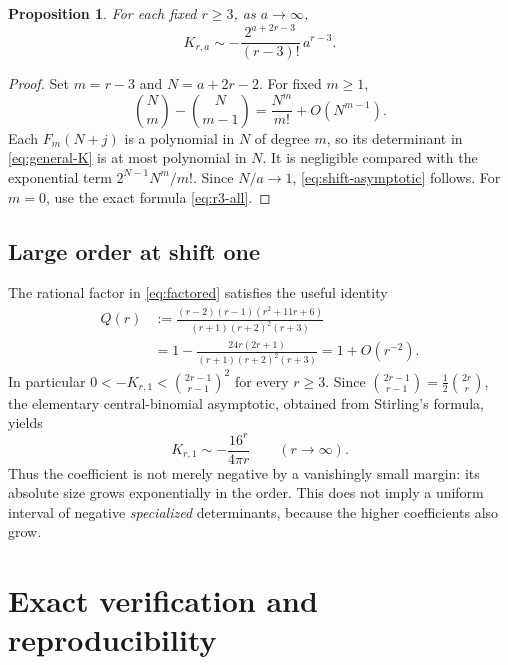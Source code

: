 \documentclass[11pt,a4paper]{article}
\newtheorem{proposition}[theorem]{Proposition}
\theoremstyle{definition}
\numberwithin{equation}{section}
\begin{document}
\begin{proposition}
\label{prop:shift-asymptotic}
For each fixed $r\ge3$, as $a\to\infty$,
\begin{equation}
 K_{r,a}\sim
 -\frac{2^{a+2r-3}}{(r-3)!}\,a^{r-3}.
 \label{eq:shift-asymptotic}
\end{equation}
\end{proposition}
\begin{proof}
Set $m=r-3$ and $N=a+2r-2$. For fixed $m\ge1$,
\[
 \binom Nm-\binom N{m-1}
   =\frac{N^m}{m!}+O(N^{m-1}).
\]
Each $F_m(N+j)$ is a polynomial in $N$ of degree $m$, so its determinant
in \eqref{eq:general-K} is at most polynomial in $N$. It is negligible
compared with the exponential term $2^{N-1}N^m/m!$. Since $N/a\to1$,
\eqref{eq:shift-asymptotic} follows. For $m=0$, use the exact formula
\eqref{eq:r3-all}.
\end{proof}

\subsection{Large order at shift one}

The rational factor in \eqref{eq:factored} satisfies the useful identity
\begin{equation}
 \begin{split}
 Q(r)&:=\frac{(r-2)(r-1)(r^2+11r+6)}{(r+1)(r+2)^2(r+3)}\\
     &=1-\frac{24r(2r+1)}{(r+1)(r+2)^2(r+3)}
       =1+O(r^{-2}).
 \end{split}
 \label{eq:Qasym}
\end{equation}
In particular $0<-K_{r,1}<\binom{2r-1}{r-1}^2$ for every $r\ge3$.
Since $\binom{2r-1}{r-1}=\tfrac12\binom{2r}{r}$, the elementary
central-binomial asymptotic, obtained from Stirling's formula, yields
\begin{equation}
 K_{r,1}\sim-\frac{16^r}{4\pi r}\qquad(r\to\infty).
 \label{eq:order-asymptotic}
\end{equation}
Thus the coefficient is not merely negative by a vanishingly small
margin: its absolute size grows exponentially in the order. This does
not imply a uniform interval of negative \emph{specialized}
determinants, because the higher coefficients also grow.

\section{Exact verification and reproducibility}
\label{sec:computation}
\end{document}
